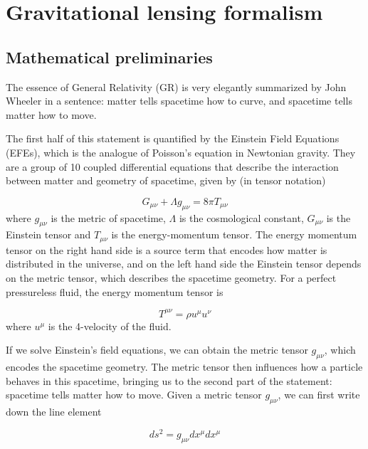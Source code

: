 \chapter{Gravitational lensing formalism}
\label{chapter:gravitational-lensing-formalism}

\section{Mathematical preliminaries}

The essence of General Relativity (GR) is very elegantly summarized by John Wheeler \citep[pg.235]{wheeler2000geons} in a sentence: matter tells spacetime how to curve, and spacetime tells matter how to move. 

The first half of this statement is quantified by the Einstein Field Equations (EFEs), which is the analogue of Poisson's equation in Newtonian gravity. They are a group of 10 coupled differential equations that describe the interaction between matter and geometry of spacetime, given by (in tensor notation)

\begin{equation}
  G_{\mu \nu} + \Lambda g_{\mu \nu} = 8\pi T_{\mu \nu}
  \label{eq:efes}
\end{equation}
where $g_{\mu \nu}$ is the metric of spacetime, $\Lambda$ is the cosmological constant, $G_{\mu \nu}$ is the Einstein tensor and $T_{\mu \nu}$ is the energy-momentum tensor. The energy momentum tensor on the right hand side is a source term that encodes how matter is distributed in the universe, and on the left hand side the Einstein tensor depends on the metric tensor, which describes the spacetime geometry. For a perfect pressureless fluid, the energy momentum tensor is

\begin{equation}
  T^{\mu \nu} = \rho u^{\mu} u^{\nu}
\end{equation}
where $u^{\mu}$ is the 4-velocity of the fluid. 

If we solve Einstein's field equations, we can obtain the metric tensor $g_{\mu \nu}$, which encodes the spacetime geometry. The metric tensor then influences how a particle behaves in this spacetime, bringing us to the second part of the statement: spacetime tells matter how to move. Given a metric tensor $g_{\mu \nu}$, we can first write down the line element

\begin{equation}
  ds^2 = g_{\mu \nu} dx^{\mu} dx^{\mu}
  \label{eq:line-element}
\end{equation}

